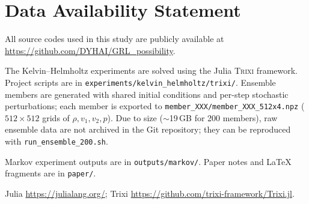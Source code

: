 
\section*{Data Availability Statement}

All source codes used in this study are publicly available at
\url{https://github.com/DYHAI/GRL_possibility}.

The Kelvin--Helmholtz experiments are solved using the Julia \textsc{Trixi} framework.
Project scripts are in \texttt{experiments/kelvin\_helmholtz/trixi/}.
Ensemble members are generated with shared initial conditions and per-step stochastic perturbations; each member is exported to \texttt{member\_XXX/member\_XXX\_512x4.npz} ($512\times512$ grids of $\rho,v_1,v_2,p$).
Due to size ($\sim$19\,GB for 200 members), raw ensemble data are not archived in the Git repository; they can be reproduced with \texttt{run\_ensemble\_200.sh}.

Markov experiment outputs are in \texttt{outputs/markov/}.
Paper notes and LaTeX fragments are in \texttt{paper/}.

Julia \url{https://julialang.org/}; Trixi \url{https://github.com/trixi-framework/Trixi.jl}.
